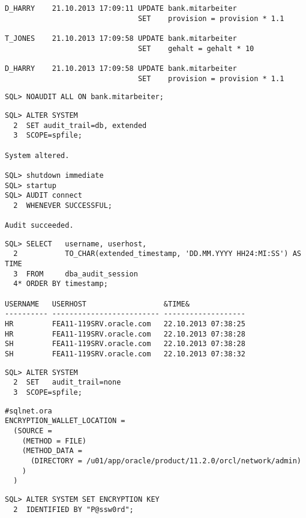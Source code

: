 \begin{enumerate}
\begin{lstlisting}[language=terminal]
D_HARRY    21.10.2013 17:09:11 UPDATE bank.mitarbeiter
                               SET    provision = provision * 1.1

T_JONES    21.10.2013 17:09:58 UPDATE bank.mitarbeiter
                               SET    gehalt = gehalt * 10

D_HARRY    21.10.2013 17:09:58 UPDATE bank.mitarbeiter
                               SET    provision = provision * 1.1
    \end{lstlisting}
    
    \begin{lstlisting}[language=oracle_sql]
SQL> NOAUDIT ALL ON bank.mitarbeiter;
    \end{lstlisting}
\clearpage	
    
    \begin{lstlisting}[language=oracle_sql,alsolanguage=sqlplus]
SQL> ALTER SYSTEM
  2  SET audit_trail=db, extended 
  3  SCOPE=spfile;

System altered.

SQL> shutdown immediate
SQL> startup
SQL> AUDIT connect
  2  WHENEVER SUCCESSFUL;

Audit succeeded.
    \end{lstlisting}
    
    
    \begin{lstlisting}[language=oracle_sql]
SQL> SELECT   username, userhost,
  2           TO_CHAR(extended_timestamp, 'DD.MM.YYYY HH24:MI:SS') AS TIME
  3  FROM     dba_audit_session
  4* ORDER BY timestamp;

USERNAME   USERHOST                  &TIME&
---------- ------------------------- -------------------
HR         FEA11-119SRV.oracle.com   22.10.2013 07:38:25
HR         FEA11-119SRV.oracle.com   22.10.2013 07:38:28
SH         FEA11-119SRV.oracle.com   22.10.2013 07:38:28
SH         FEA11-119SRV.oracle.com   22.10.2013 07:38:32
    \end{lstlisting}
    
    \begin{lstlisting}[language=oracle_sql]
SQL> ALTER SYSTEM
  2  SET   audit_trail=none
  3  SCOPE=spfile;
    \end{lstlisting}
\clearpage	
    
    \begin{lstlisting}[language=configfile]
#sqlnet.ora
ENCRYPTION_WALLET_LOCATION =
  (SOURCE =
    (METHOD = FILE)
    (METHOD_DATA =
      (DIRECTORY = /u01/app/oracle/product/11.2.0/orcl/network/admin)
    )
  )
    \end{lstlisting}
    \begin{lstlisting}[language=oracle_sql]
SQL> ALTER SYSTEM SET ENCRYPTION KEY
  2  IDENTIFIED BY "P@ssw0rd";


\end{lstlisting}
\end{enumerate}
